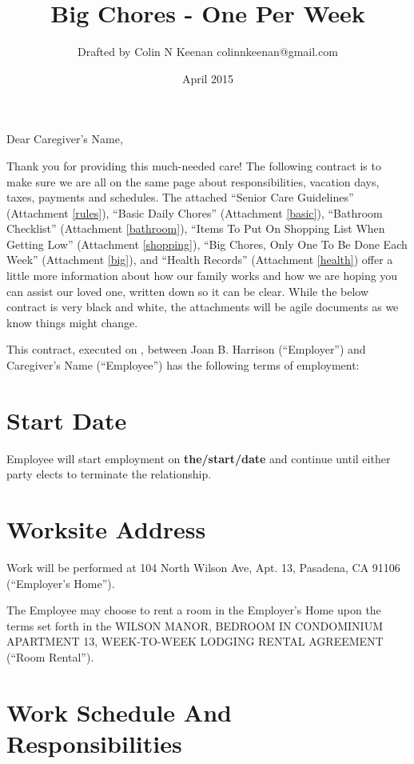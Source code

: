 \documentclass[]{article}
\newcommand{\mytitle}{Big Chores - One Per Week}
\newcommand{\agreementtitle}{WILSON MANOR, BEDROOM IN CONDOMINIUM APARTMENT 13, WEEK-TO-WEEK LODGING RENTAL AGREEMENT}
\newcommand{\startdate}{the/start/date}
\newcommand{\datefillin}{\hspace{0.2cm}\makebox[3cm]{\hrulefill}}
\newcommand{\caregiver}{Caregiver's Name}
\newcommand{\mom}{Joan B. Harrison}
\newcommand{\rules}{Senior Care Guidelines}
\newcommand{\basic}{Basic Daily Chores}
\newcommand{\bathroom}{Bathroom Checklist}
\newcommand{\shopping}{Items To Put On Shopping List When Getting Low}
\newcommand{\bigchores}{Big Chores, Only One To Be Done Each Week}
\newcommand{\health}{Health Records}
\begin{document}
\title{\mytitle{}}
\author{Drafted by Colin N Keenan colinnkeenan@gmail.com}
\date{April 2015}
\maketitle

Dear \caregiver{},

Thank you for providing this much-needed care! The following contract is to make sure we are all on the same page about responsibilities, vacation days, taxes, payments and schedules. The attached ``\rules{}'' (Attachment \ref{rules}), ``\basic{}'' (Attachment \ref{basic}), ``\bathroom{}'' (Attachment \ref{bathroom}), ``\shopping{}'' (Attachment \ref{shopping}), ``\bigchores{}'' (Attachment \ref{big}), and ``\health{}'' (Attachment \ref{health}) offer a little more information about how our family works and how we are hoping you can assist our loved one, written down so it can be clear. While the below contract is very black and white, the attachments will be agile documents as we know things might change.

This contract, executed on \datefillin{}, between \mom{} (``Employer'') and \caregiver{} (``Employee'') has the following terms of employment:

\section{Start Date}

Employee will start employment on \textbf{\startdate{}} and continue until either party elects to terminate the relationship.

\section{Worksite Address}

Work will be performed at 104 North Wilson Ave, Apt. 13, Pasadena, CA 91106 (``Employer's Home'').

The Employee may choose to rent a room in the Employer's Home upon the terms set forth in the \agreementtitle{} (``Room Rental'').

\section{Work Schedule And Responsibilities}
\end{document}
